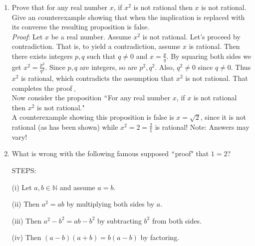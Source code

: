 \documentclass[12pt]{amsart}
\theoremstyle{definition}
\theoremstyle{remark}
\newcommand{\nats}{\mathbb N}
\begin{document}
\begin{enumerate}
\newpage


\item Prove that for any real number $x$, if $x^2 $ is not rational then $x$ is not rational.  Give an counterexample showing that when the implication is replaced with its converse the resulting proposition is false.\\

{\color{red} \emph{Proof}: Let $x$ be a real number.  Assume $x^2$ is not rational.  Let's proceed by contradiction.  That is, to yield a contradiction, assume $x$ is rational.  Then there exists integers $p,q$ such that $q\neq 0$ and $x=\frac{p}{q}$.  By squaring both sides we get $x^2=\frac{p^2}{q^2}$.  Since $p,q$ are integers, so are $p^2,q^2$.  Also, $q^2\neq 0$ since $q\neq 0$.  Thus $x^2$ is rational, which contradicts the assumption that $x^2$ is not rational.  That completes the proof$\;_{\square}$  \\

Now consider the proposition $``$For any real number $x$, if $x$ is not rational then $x^2$ is not rational."  \\

A counterexample showing this proposition is false is $x=\sqrt{2}$, since it is not rational (as has been shown) while $x^2=2=\frac{2}{1}$ is rational!  Note:  Answers may vary!}

\newpage

\item What is wrong with the following famous supposed $``$proof" that $1=2$?


\bigskip

\hspace{0.5cm} STEPS:

\bigskip

\hspace{0.5cm} (i)  Let $a,b\in\nats$ and assume $a=b$.

\medskip

\hspace{0.5cm} (ii) Then $a^{2}=ab$ by multiplying both sides by $a$.

\medskip

\hspace{0.5cm} (iii) Then $a^{2}-b^{2}=ab-b^{2}$ by subtracting $b^{2}$ from both sides.


\medskip

\hspace{0.5cm} (iv) Then $(a-b)(a+b)=b(a-b)$ by factoring.



\end{enumerate}
\end{document}
